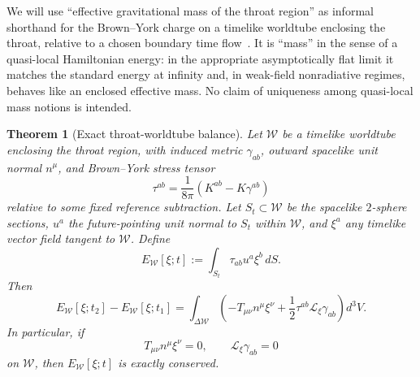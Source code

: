 \documentclass[aps,prd,onecolumn,nofootinbib,superscriptaddress]{revtex4-2}
\newtheorem{theorem}{Theorem}
\begin{document}
We will use ``effective gravitational mass of the throat region'' as informal
shorthand for the Brown--York charge on a timelike worldtube enclosing the
throat, relative to a chosen boundary time
flow~\cite{BrownYork1993Quasilocal,Szabados2009Quasilocal}.  It is ``mass'' in
the sense of a quasi-local Hamiltonian energy: in the appropriate
asymptotically flat limit it matches the standard energy at infinity and, in
weak-field nonradiative regimes, behaves like an enclosed effective mass.  No
claim of uniqueness among quasi-local mass notions is intended.

\begin{theorem}[Exact throat-worldtube balance]
\label{thm:BY-worldtube}
Let $\mathcal{W}$ be a timelike worldtube enclosing the throat region, with
induced metric $\gamma_{ab}$, outward spacelike unit normal $n^\mu$, and
Brown--York stress tensor~\cite{BrownYork1993Quasilocal}
\begin{equation}
  \tau^{ab}=\frac{1}{8\pi}\left(K^{ab}-K\gamma^{ab}\right)
\end{equation}
relative to some fixed reference subtraction.  Let $S_t\subset\mathcal{W}$ be
the spacelike $2$-sphere sections, $u^a$ the future-pointing unit normal to
$S_t$ within $\mathcal{W}$, and $\xi^a$ any timelike vector field tangent to
$\mathcal{W}$.  Define
\begin{equation}
  E_{\mathcal{W}}[\xi;t]
  := \int_{S_t}\tau_{ab}u^a\xi^b\,dS.
\end{equation}
Then
\begin{equation}
\label{eq:BY-balance}
  E_{\mathcal{W}}[\xi;t_2]-E_{\mathcal{W}}[\xi;t_1]
  =
  \int_{\Delta\mathcal{W}}
  \left(
    -T_{\mu\nu}n^\mu\xi^\nu
    +\frac12\tau^{ab}\mathcal{L}_\xi\gamma_{ab}
  \right)d^3V.
\end{equation}
In particular, if
\begin{equation}
  T_{\mu\nu}n^\mu\xi^\nu = 0,
  \qquad
  \mathcal{L}_\xi\gamma_{ab}=0
\end{equation}
on $\mathcal{W}$, then $E_{\mathcal{W}}[\xi;t]$ is exactly conserved.
\end{theorem}
\end{document}
